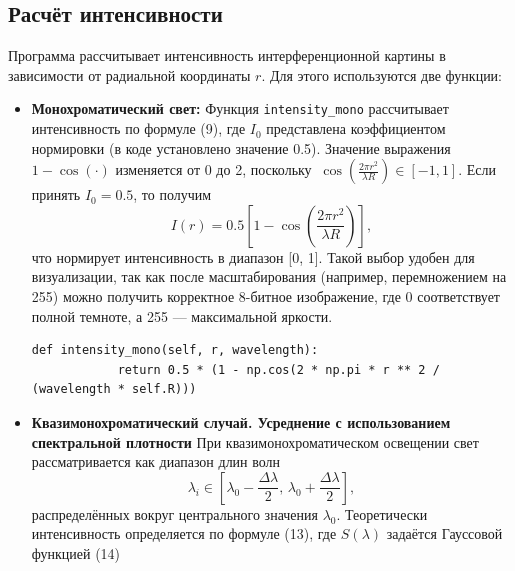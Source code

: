 \documentclass[a4paper,11pt]{article}
\theoremstyle{definition}
\begin{document}
    \subsection{Расчёт интенсивности}
    Программа рассчитывает интенсивность интерференционной картины в зависимости от радиальной координаты \( r \).
    Для этого используются две функции:
    \begin{itemize}
        \item \textbf{Монохроматический свет:} Функция \texttt{intensity\_mono} рассчитывает интенсивность
        по формуле (9), где \(I_0\) представлена коэффициентом нормировки (в коде установлено значение 0.5).
        Значение выражения \(1 - \cos(\cdot)\) изменяется от 0 до 2, поскольку
        \(\
        \cos\left(\frac{2\pi r^2}{\lambda R}\right) \in [-1, 1].
        \)
        Если принять \(I_0 = 0.5\), то получим
        \[
            I(r) = 0.5\left[1 - \cos\left(\frac{2\pi r^2}{\lambda R}\right)\right],
        \]
        что нормирует интенсивность в диапазон [0, 1]. Такой выбор удобен для визуализации, так как после масштабирования
        (например, перемножением на 255) можно получить корректное 8-битное изображение, где 0 соответствует полной
        темноте, а 255 --- максимальной яркости.

        \begin{lstlisting}[language=MyPython, label={lst:lstlisting}]
        def intensity_mono(self, r, wavelength):
            return 0.5 * (1 - np.cos(2 * np.pi * r ** 2 / (wavelength * self.R)))
        \end{lstlisting}

        \item{\textbf{Квазимонохроматический случай. Усреднение с использованием спектральной плотности}}
        При квазимонохроматическом освещении свет рассматривается как диапазон длин волн
        \[
            \lambda_i \in \left[\lambda_0 - \frac{\Delta\lambda}{2}, \, \lambda_0 + \frac{\Delta\lambda}{2}\right],
        \]
        распределённых вокруг центрального значения \(\lambda_0\). Теоретически интенсивность
        определяется по формуле (13), где \(S(\lambda)\) задаётся Гауссовой функцией (14)


\end{itemize}
\end{document}

